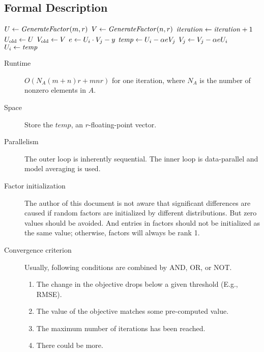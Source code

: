 \subsection{Formal Description}
\begin{algorithm} \label{alg:lmf-igd}
\begin{algorithmic}[1]
	\State $U \leftarrow \mathit{GenerateFactor}(m, r)$
	\State $V \leftarrow \mathit{GenerateFactor}(n, r)$
	\Repeat
		\State $\mathit{iteration} \leftarrow \mathit{iteration} + 1$
		\State $U_\text{old} \leftarrow U$
		\State $V_\text{old} \leftarrow V$
		 
			\State $e \leftarrow U_i \cdot V_j - y$
			\State $\mathit{temp} \leftarrow U_i - \alpha e V_j$
			\State $V_j \leftarrow V_j - \alpha e U_i$ 
			\State $U_i \leftarrow \mathit{temp}$ 
		\EndFor
\end{algorithmic}
\end{algorithm}

\begin{description}
	\item[Runtime] $O(N_{A} (m + n) r + m n r)$ for one iteration,
        where $N_{A}$ is the number of nonzero elements in $A$.

	\item[Space] Store the $\mathit{temp}$, an $r$-floating-point vector.

	\item[Parallelism] The outer loop is inherently sequential.
        The inner loop is data-parallel and model averaging \cite{DBLP:conf/nips/DuchiAW10} is used.

    \item[Factor initialization] The author of this document is not aware that significant differences are caused if random factors are initialized by different distributions.
        But zero values should be avoided.
        And entries in factors should not be initialized as the same value; otherwise, factors will always be rank 1.

    \item[Convergence criterion] Usually, following conditions are combined by AND, OR, or NOT.
        \begin{enumerate}
            \item The change in the objective drops below a given threshold (E.g., RMSE).
            \item The value of the objective matches some pre-computed value.
            \item The maximum number of iterations has been reached.
            \item There could be more.
        \end{enumerate}
\end{description}
